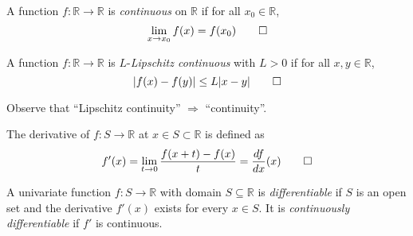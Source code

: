 \begin{definition}[Continuity]
A function \(f:\mathbb{R}\rightarrow\mathbb{R}\) is \emph{continuous} on $\mathbb{R}$ if for all \(x_{0}\in\mathbb{R}\),
\[
\lim_{x\to x_{0}}f(x)=f(x_{0})
\qedhere
\]
\end{definition}

\begin{definition}
A function \(f:\mathbb{R}\rightarrow\mathbb{R}\) is \(L\)-\emph{Lipschitz continuous} with \(L>0\) if for all \(x,y\in\mathbb{R}\),
\[
|f(x)-f(y)|\leq L|x-y|
\qedhere
\]
\end{definition}

Observe that ``Lipschitz continuity'' $\Longrightarrow$ ``continuity''.

\begin{definition}[Derivative]
The derivative of \(f:S\rightarrow\mathbb{R}\) at \(x\in S\subset\mathbb{R}\) is defined as
\[
f'(x)=\lim_{t\to 0}\frac{f(x+t)-f(x)}{t}=\frac{df}{dx}(x)
\qedhere
\]
\end{definition}

\begin{definition}[Differentiability]
A univariate function \(f:S\rightarrow\mathbb{R}\) with domain \(S\subseteq\mathbb{R}\) is \emph{differentiable} if \(S\) is an open set and the derivative \(f'(x)\) exists for every \(x\in S\). It is \emph{continuously differentiable} if \(f'\) is continuous.
\end{definition}


